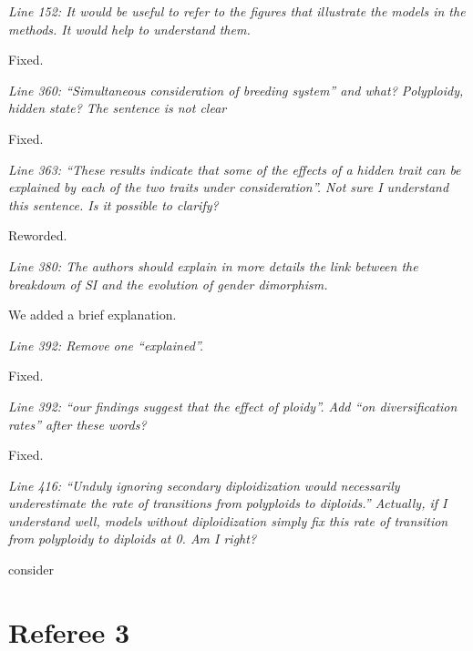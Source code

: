 \documentclass[11pt]{article}
\renewenvironment{quote}{\bigskip\noindent\itshape\ignorespaces}{\smallskip}
\begin{document}
\begin{quote}
Line 152: It would be useful to refer to the figures that illustrate the models in the methods.
It would help to understand them.
\end{quote}

Fixed. %

\begin{quote}
Line 360: ``Simultaneous consideration of breeding system'' and what?
Polyploidy, hidden state?
The sentence is not clear
\end{quote}

Fixed.

\begin{quote}
Line 363: ``These results indicate that some of the effects of a hidden trait can be explained by each of the two traits under consideration''.
Not sure I understand this sentence. Is it possible to clarify?
\end{quote}

Reworded.

\begin{quote}
Line 380: The authors should explain in more details the link between the breakdown of SI and the evolution of gender dimorphism.
\end{quote}

We added a brief explanation.

\begin{quote}
Line 392: Remove one ``explained''.
\end{quote}

Fixed.

\begin{quote}
Line 392: ``our findings suggest that the effect of ploidy''.
Add ``on diversification rates'' after these words?
\end{quote}

Fixed.

\begin{quote}
Line 416: ``Unduly ignoring secondary diploidization would necessarily underestimate the rate of transitions from polyploids to diploids.''
Actually, if I understand well, models without diploidization simply fix this rate of transition from polyploidy to diploids at 0.
Am I right?
\end{quote}

consider %

\section{Referee 3}
\vspace{-11pt}
\end{document}
